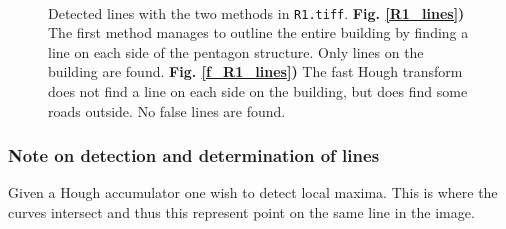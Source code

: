 \documentclass[a4paper, 10pt, final]{article}
\begin{document}
\begin{figure}[!h]
    \centering
    \\
    \caption[]{
    Detected lines with the two methods in \texttt{R1.tiff}.
    \textbf{Fig. \ref{R1_lines})} The first method manages to outline
    the entire building by finding a line on each side of the pentagon
    structure. Only lines on the building are found.
    \textbf{Fig. \ref{f_R1_lines})} The fast Hough transform does not
    find a line on each side on the building, but does find some
    roads outside. No false lines are found.
    }
    \label{R1_hough_transform}
\end{figure}

\subsubsection*{Note on detection and determination of lines}
Given a Hough accumulator one wish to detect local maxima. This is where
the curves intersect and thus this represent point on the same line in
the image.
\end{document}

